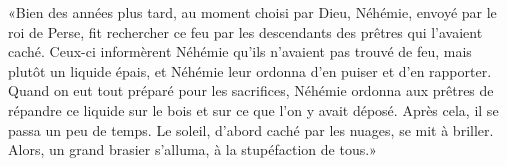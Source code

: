 «Bien des années plus tard, au moment choisi par Dieu,
	Néhémie, envoyé par le roi de Perse,
	fit rechercher ce feu par les descendants des prêtres qui l’avaient caché.
Ceux-ci informèrent Néhémie qu’ils n’avaient pas trouvé de feu,
	mais plutôt un liquide épais, et Néhémie leur ordonna d’en puiser et d’en rapporter.
Quand on eut tout préparé pour les sacrifices,
	Néhémie ordonna aux prêtres de répandre ce liquide sur le bois
		et sur ce que l’on y avait déposé.
Après cela, il se passa un peu de temps.
Le soleil, d’abord caché par les nuages, se mit à briller.
	Alors, un grand brasier s’alluma, à la stupéfaction de tous.»
